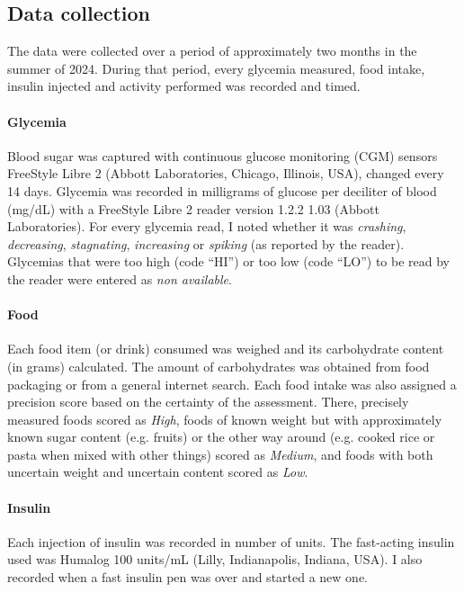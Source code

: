 \subsection*{Data collection}

The data were collected over a period of approximately two months in the summer of 2024.
During that period, every glycemia measured, food intake, insulin injected and activity performed was recorded and timed.

\paragraph{Glycemia} Blood sugar was captured with continuous glucose monitoring (CGM) sensors FreeStyle Libre 2 (Abbott Laboratories, Chicago, Illinois, USA), changed every 14 days.
Glycemia was recorded in milligrams of glucose per deciliter of blood (mg/dL) with a FreeStyle Libre 2 reader version 1.2.2 1.03 (Abbott Laboratories).
For every glycemia read, I noted whether it was \textit{crashing}, \textit{decreasing}, \textit{stagnating}, \textit{increasing} or \textit{spiking} (as reported by the reader).
Glycemias that were too high (code ``HI'') or too low (code ``LO'') to be read by the reader were entered as \textit{non available}.

\paragraph{Food} Each food item (or drink) consumed was weighed and its carbohydrate content (in grams) calculated. 
The amount of carbohydrates was obtained from food packaging or from a general internet search.
Each food intake was also assigned a precision score based on the certainty of the assessment.
There, precisely measured foods scored as \textit{High}, foods of known weight but with approximately known sugar content (e.g. fruits) or the other way around (e.g. cooked rice or pasta when mixed with other things) scored as \textit{Medium}, and foods with both uncertain weight and uncertain content scored as \textit{Low}.

\paragraph{Insulin} Each injection of insulin was recorded in number of units.
The fast-acting insulin used was Humalog 100 units/mL (Lilly, Indianapolis, Indiana, USA). 
I also recorded when a fast insulin pen was over and started a new one.

